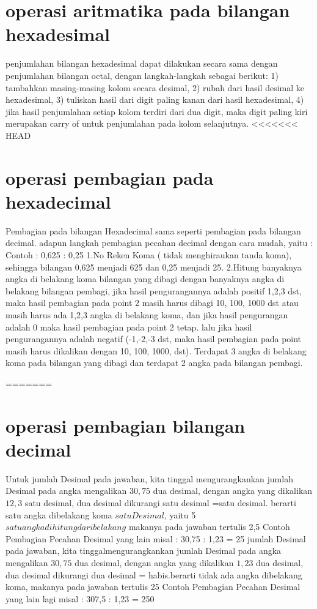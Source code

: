 \section{operasi aritmatika pada bilangan hexadesimal}
penjumlahan bilangan hexadesimal dapat dilakukan secara sama dengan penjumlahan bilangan octal, dengan langkah-langkah sebagai berikut: 1) tambahkan masing-masing kolom secara desimal, 2) rubah dari hasil desimal ke hexadesimal, 3) tuliskan hasil dari digit paling kanan dari hasil hexadesimal, 4) jika hasil penjumlahan setiap kolom terdiri dari dua digit, maka digit paling kiri merupakan carry of untuk penjumlahan pada kolom selanjutnya.
<<<<<<< HEAD
\section {operasi pembagian pada hexadecimal}
Pembagian pada bilangan Hexadecimal sama seperti pembagian pada bilangan decimal. adapun langkah pembagian pecahan decimal dengan cara mudah, yaitu :
	Contoh : 0,625 : 0,25
	1.No Reken Koma ( tidak menghiraukan tanda koma), sehingga bilangan 0,625 menjadi 625 dan 0,25 menjadi 25.
	2.Hitung banyaknya angka di belakang koma bilangan yang dibagi dengan banyaknya angka di belakang bilangan pembagi, jika hasil pengurangannya adalah positif 1,2,3 dst, maka hasil pembagian pada point 2 masih harus dibagi 10, 100, 1000 dst atau masih harus ada 1,2,3 angka di belakang koma, dan jika hasil pengurangan adalah 0 maka hasil pembagian pada point 2 tetap. lalu jika hasil pengurangannya adalah negatif (-1,-2,-3 dst, maka hasil pembagian pada point masih harus dikalikan dengan 10, 100, 1000, dst). Terdapat 3 angka di belakang koma pada bilangan yang dibagi dan terdapat 2 angka pada bilangan pembagi. 

=======
\section{operasi pembagian bilangan decimal}
Untuk jumlah Desimal pada jawaban, kita tinggal mengurangkankan jumlah Desimal pada angka mengalikan \(30,75\) dua desimal, 
dengan angka yang dikalikan \(12,3\) satu desimal, 
dua desimal dikurangi satu desimal =satu desimal. berarti satu angka dibelakang koma \(satu Desimal\), yaitu 5 \(satu angka dihitung dari belakang\) makanya pada jawaban tertulis 2,5
 Contoh Pembagian Pecahan Desimal yang lain misal : 
 30,75 : 1,23 = 25
jumlah Desimal pada jawaban, kita tinggalmengurangkankan jumlah Desimal pada angka mengalikan \(30,75\) dua desimal, 
dengan angka yang dikalikan \(1,23\) dua desimal, 
dua desimal dikurangi dua desimal = habis.berarti tidak ada angka dibelakang koma, makanya pada jawaban tertulis 25
 Contoh Pembagian Pecahan Desimal yang lain lagi misal : 
 307,5 : 1,23 = 250

